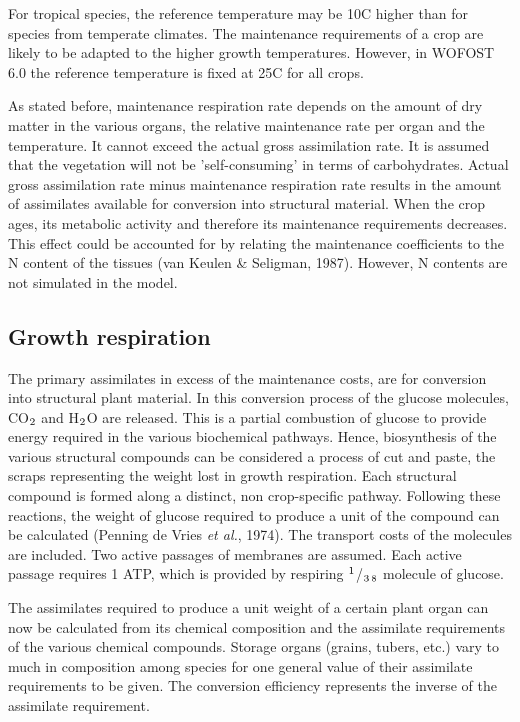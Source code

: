  
For tropical species, the reference temperature may be 10\degrees C higher than for species from
temperate climates. The maintenance requirements of a crop are likely to be adapted to
the higher growth temperatures. However, in WOFOST 6.0 the reference temperature is
fixed at 25\degrees C for all crops.

As stated before, maintenance respiration rate depends on the amount of dry matter in the
various organs, the relative maintenance rate per organ and the temperature. It cannot
exceed the actual gross assimilation rate. It is assumed that the vegetation will not be
'self-consuming' in terms of carbohydrates. Actual gross assimilation rate minus 
mainten\-ance respiration rate results in the amount of assimilates available for conversion into
structural material. When the crop ages, its metabolic activity and therefore its
mainten\-ance require\-ments decreases. This effect could be accounted for by relating 
the mainten\-ance coefficients to the N content of the tissues (van Keulen \& Seligman, 1987).
However, N contents are not simulated in the model. 

\subsection{Growth respiration}

The primary assimilates in excess of the maintenance costs, are for conversion into
structural plant material. In this conversion process of the glucose molecules, CO$_{{\rm 2}}$ and
H$_{{\rm 2}}$O are released. This is a partial combustion of glucose to provide energy required in
the various biochemical pathways. Hence, biosynthesis of the various structural com\-pounds can 
be considered a process of cut and paste, the scraps representing the weight
lost in growth respiration.
Each structural compound is formed along a distinct, non crop-specific pathway.
Following these reactions, the weight of glucose required to produce a unit of the
compound can be calculated (Penning de Vries {\it et al.\/}, 1974). The transport costs of the
molecules are included. Two active passages of membranes are assumed. Each active
passage requires 1 ATP, which is provided by respiring $^{{\rm 1}}$/$_{{\rm 3}}$$_{{\rm 8}}$ molecule of glucose.

The assimilates required to produce a unit weight of a certain plant organ can now be
calculated from its chemical composition and the assimilate requirements of the various
chemical com\-pounds. Storage organs (grains, tubers, etc.) vary to much in composition
among species for one general value of their assimilate requirements to be given. The
conversion efficiency represents the inverse of the assimilate require\-ment.

